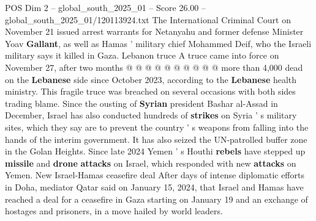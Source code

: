 \begin{textsample}{POS Dim 2 – global\_south\_2025\_01 – Score 26.00 – global\_south\_2025\_01/120113924.txt}
The International Criminal Court on November 21 issued arrest warrants for Netanyahu and former defense Minister Yoav \textbf{Gallant}, as well as Hamas ' military chief Mohammed Deif, who the Israeli military says it killed in Gaza.
Lebanon truce A truce came into force on November 27, after two months @ @ @ @ @ @ @ @ @ @ more than 4,000 dead on the \textbf{Lebanese} side since October 2023, according to the \textbf{Lebanese} health ministry.
This fragile truce was breached on several occasions with both sides trading blame.
Since the ousting of \textbf{Syrian} president Bashar al-Assad in December, Israel has also conducted hundreds of \textbf{strikes} on Syria ' s military sites, which they say are to prevent the country ' s weapons from falling into the hands of the interim government.
It has also seized the UN-patrolled buffer zone in the Golan Heights.
Since late 2024 Yemen ' s Houthi \textbf{rebels} have stepped up \textbf{missile} and \textbf{drone} \textbf{attacks} on Israel, which responded with new \textbf{attacks} on Yemen.
New Israel-Hamas ceasefire deal After days of intense diplomatic efforts in Doha, mediator Qatar said on January 15, 2024, that Israel and Hamas have reached a deal for a ceasefire in Gaza starting on January 19 and an exchange of hostages and prisoners, in a move hailed by world leaders.

\end{textsample}
